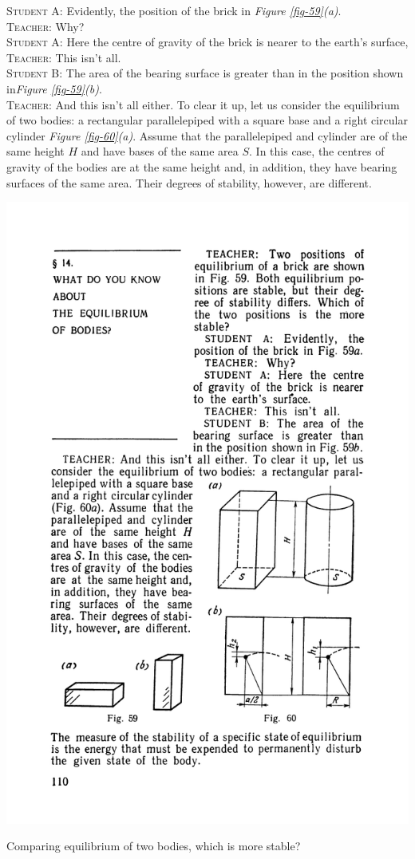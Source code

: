 \documentclass[a4paper,sfsidenotes]{tufte-book}
\begin{document}
\textsc{Student A:} Evidently, the position of the brick in \emph{Figure \ref{fig-59}(a)}.
\\
\textsc{Teacher:} Why?
\\
\textsc{Student A:} Here the centre of gravity of the brick is nearer to the earth's surface,
\\
\textsc{Teacher:} This isn't all.
\\
\textsc{Student B:} The area of the bearing surface is greater than in the position shown in\emph{Figure \ref{fig-59}(b)}.
\\
\textsc{Teacher:} And this isn't all either. To clear it up, let us consider the equilibrium of two bodies: a rectangular parallelepiped with a square base and a right circular cylinder \emph{Figure \ref{fig-60}(a)}. Assume that the parallelepiped and cylinder are of the same height $H$ and have bases of the same area $S$. In this case, the centres of gravity of the bodies are at the same height and, in addition, they have bearing surfaces of the same area. Their degrees of stability, however, are different.

\begin{marginfigure}
\centering
\includegraphics[width=\linewidth]{fig-060a.pdf}
\caption{Comparing equilibrium of two bodies, which is more stable?}
\label{fig-60}
\end{marginfigure}
\end{document}
